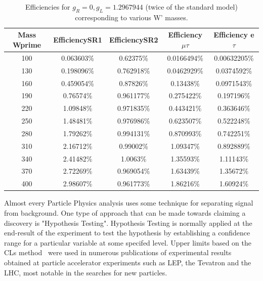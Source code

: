  \begin{table}[htb]
 	\centering
  	\begin{tabular}{|ccccc|}
  		\hline 
  		Mass Wprime  & EfficiencySR1  & EfficiencySR2 & Efficiency $\mu$$\tau$ & Efficiency e $\tau$ \\
 \hline 
100& 0.063603\%& 0.62375\%& 0.0166494\%& 0.00632205\%\\
130& 0.198096\%& 0.762918\%& 0.0462929\%& 0.0374592\%\\
160& 0.459054\%& 0.87826\%& 0.13438\%& 0.0971543\%\\
190& 0.76574\%& 0.961177\%& 0.275422\%& 0.197196\%\\
220& 1.09848\%& 0.971835\%& 0.443421\%& 0.363646\%\\
250& 1.48481\%& 0.976986\%& 0.623507\%& 0.522248\%\\
280& 1.79262\%& 0.994131\%& 0.870993\%& 0.742251\%\\
310& 2.16712\%& 0.99002\%& 1.09347\%& 0.892889\%\\
340& 2.41482\%& 1.0063\%& 1.35593\%& 1.11143\%\\
370& 2.72269\%&0.969054\%& 1.63439\%& 1.35672\%\\
400& 2.98607\%& 0.961773\%& 1.86216\%& 1.60924\%\\
  	
  	\hline
  	\end{tabular}
  	\caption{Efficiencies for $ g_R=0 , g_L=1.2967944 $ (twice of the standard model) corresponding to various W' masses. \label{eff-twice} }
  \end{table}
  

   

Almost every Particle Physics analysis uses some technique for separating signal from background. One type of approach that can be made towards claiming a discovery is "Hypothesis Testing". Hypothesis Testing is normally applied at the end-result of the experiment to test the hypothesis by establishing a confidence range for a particular variable at some specifed level. Upper limits based on the CLs method~\cite{0954-3899-28-10-313,Mistlberger:2012rs} were used in numerous publications of experimental results obtained at particle accelerator experiments such as LEP, the Tevatron and the LHC, most notable in the searches for new particles. 


